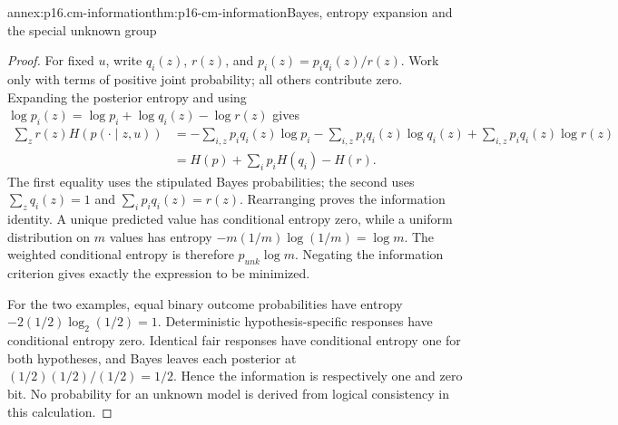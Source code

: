 \begin{annexitem}{annex:p16.cm-information}{thm:p16-cm-information}{Bayes, entropy expansion and the special unknown group}
\begin{proof}
For fixed \(u\), write \(q_i(z)\), \(r(z)\), and
\(p_i(z)=p_iq_i(z)/r(z)\). Work only with terms of positive joint
probability; all others contribute zero. Expanding the posterior entropy
and using \(\log p_i(z)=\log p_i+\log q_i(z)-\log r(z)\) gives
\[
\begin{split}
\sum_z r(z)H(p(\cdot\mid z,u))
 &=-\sum_{i,z}p_iq_i(z)\log p_i
   -\sum_{i,z}p_iq_i(z)\log q_i(z)
   +\sum_{i,z}p_iq_i(z)\log r(z)\\
 &=H(p)+\sum_i p_iH(q_i)-H(r).
\end{split}
\]
The first equality uses the stipulated Bayes probabilities; the second
uses \(\sum_z q_i(z)=1\) and \(\sum_i p_iq_i(z)=r(z)\).
Rearranging proves the information identity. A unique predicted value has
conditional entropy zero, while a uniform distribution on \(m\) values
has entropy \(-m(1/m)\log(1/m)=\log m\). The weighted conditional
entropy is therefore \(p_{unk}\log m\). Negating the information
criterion gives exactly the expression to be minimized.

For the two examples, equal binary outcome probabilities have entropy
\(-2(1/2)\log_2(1/2)=1\). Deterministic hypothesis-specific responses
have conditional entropy zero. Identical fair responses have conditional
entropy one for both hypotheses, and Bayes leaves each posterior at
\((1/2)(1/2)/(1/2)=1/2\). Hence the information is respectively
one and zero bit. No probability for an unknown model is derived from
logical consistency in this calculation.
\end{proof}
\end{annexitem}

